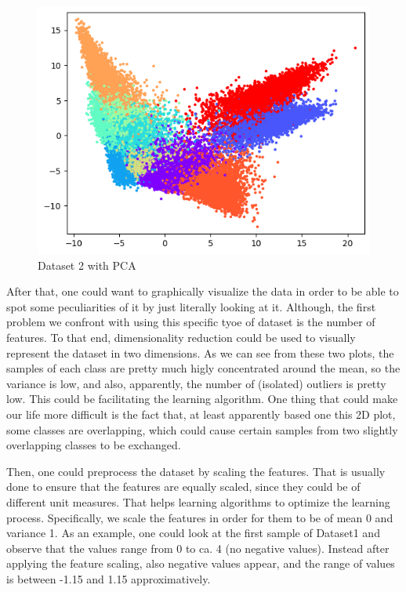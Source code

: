\documentclass[12pt,a4paper,oneside]{article}
\begin{document}
\begin{figure}[H]
    \includegraphics{figures/dataset2.png}
    \caption{Dataset 2 with PCA}
\end{figure}

\newpage

After that, one could want to graphically visualize the data in order to be able
to spot some peculiarities of it by just literally looking at it. Although, the
first problem we confront with using this specific tyoe of dataset is the number
of features. To that end, dimensionality reduction could be used to visually
represent the dataset in two dimensions. As we can see from these two plots, the
samples of each class are pretty much higly concentrated around the mean, so the
variance is low, and also, apparently, the number of (isolated) outliers is
pretty low. This could be facilitating the learning algorithm. One thing that
could make our life more difficult is the fact that, at least apparently
based one this 2D plot, some classes are overlapping, which could cause certain
samples from two slightly overlapping classes to be exchanged.

Then, one could preprocess the dataset by scaling the features. That is usually
done to ensure that the features are equally scaled, since they could be of
different unit measures. That helps learning algorithms to optimize the learning
process. Specifically, we scale the features in order for them to be of mean 0
and variance 1. As an example, one could look at the first sample of Dataset1
and observe that the values range from 0 to ca. 4 (no negative values). Instead
after applying the feature scaling, also negative values appear, and the range
of values is between -1.15 and 1.15 approximatively.
\end{document}
